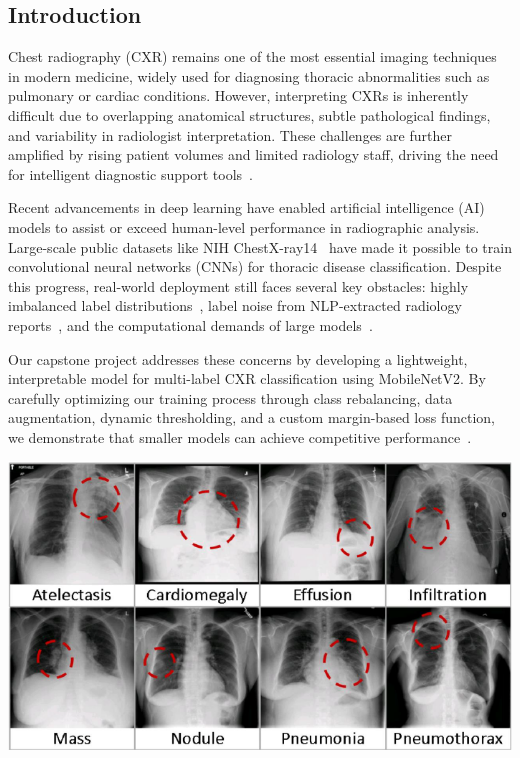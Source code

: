 \documentclass[12pt]{article}
\begin{document}
\begin{multicols}{2}

\section{Introduction}

Chest radiography (CXR) remains one of the most essential imaging techniques in modern medicine, widely used for diagnosing thoracic abnormalities such as pulmonary or cardiac conditions. However, interpreting CXRs is inherently difficult due to overlapping anatomical structures, subtle pathological findings, and variability in radiologist interpretation. These challenges are further amplified by rising patient volumes and limited radiology staff, driving the need for intelligent diagnostic support tools~\cite{wang2017chestx}.

Recent advancements in deep learning have enabled artificial intelligence (AI) models to assist or exceed human-level performance in radiographic analysis. Large-scale public datasets like NIH ChestX-ray14~\cite{wang2017chestx} have made it possible to train convolutional neural networks (CNNs) for thoracic disease classification. Despite this progress, real-world deployment still faces several key obstacles: highly imbalanced label distributions~\cite{baltruschat2019comparison}, label noise from NLP-extracted radiology reports~\cite{irvin2019chexpert}, and the computational demands of large models~\cite{johnson2019mimic}.

Our capstone project addresses these concerns by developing a lightweight, interpretable model for multi-label CXR classification using MobileNetV2. By carefully optimizing our training process through class rebalancing, data augmentation, dynamic thresholding, and a custom margin-based loss function, we demonstrate that smaller models can achieve competitive performance~\cite{sandler2018mobilenetv2}.

\begin{center}
    \includegraphics[width=\linewidth]{figure1.1.png}
    

\end{center}
\end{multicols}
\end{document}
